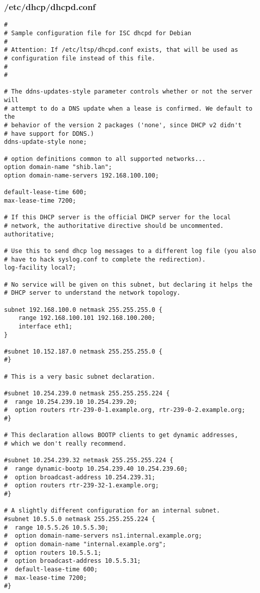 \subsubsection{/etc/dhcp/dhcpd.conf}
\begin{lstlisting}
#
# Sample configuration file for ISC dhcpd for Debian
#
# Attention: If /etc/ltsp/dhcpd.conf exists, that will be used as
# configuration file instead of this file.
#
#

# The ddns-updates-style parameter controls whether or not the server will
# attempt to do a DNS update when a lease is confirmed. We default to the
# behavior of the version 2 packages ('none', since DHCP v2 didn't
# have support for DDNS.)
ddns-update-style none;

# option definitions common to all supported networks...
option domain-name "shib.lan";
option domain-name-servers 192.168.100.100;

default-lease-time 600;
max-lease-time 7200;

# If this DHCP server is the official DHCP server for the local
# network, the authoritative directive should be uncommented.
authoritative;

# Use this to send dhcp log messages to a different log file (you also
# have to hack syslog.conf to complete the redirection).
log-facility local7;

# No service will be given on this subnet, but declaring it helps the
# DHCP server to understand the network topology.

subnet 192.168.100.0 netmask 255.255.255.0 {
	range 192.168.100.101 192.168.100.200;
	interface eth1;
}

#subnet 10.152.187.0 netmask 255.255.255.0 {
#}

# This is a very basic subnet declaration.

#subnet 10.254.239.0 netmask 255.255.255.224 {
#  range 10.254.239.10 10.254.239.20;
#  option routers rtr-239-0-1.example.org, rtr-239-0-2.example.org;
#}

# This declaration allows BOOTP clients to get dynamic addresses,
# which we don't really recommend.

#subnet 10.254.239.32 netmask 255.255.255.224 {
#  range dynamic-bootp 10.254.239.40 10.254.239.60;
#  option broadcast-address 10.254.239.31;
#  option routers rtr-239-32-1.example.org;
#}

# A slightly different configuration for an internal subnet.
#subnet 10.5.5.0 netmask 255.255.255.224 {
#  range 10.5.5.26 10.5.5.30;
#  option domain-name-servers ns1.internal.example.org;
#  option domain-name "internal.example.org";
#  option routers 10.5.5.1;
#  option broadcast-address 10.5.5.31;
#  default-lease-time 600;
#  max-lease-time 7200;
#}


\end{lstlisting}
